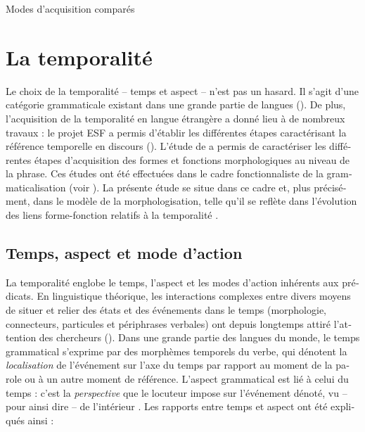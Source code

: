 \documentclass[french, output=paper]{langscibook}
\begin{document}
\begin{otherlanguage}{french}
\begin{table}
\caption{\label{fig:kihlstedt:1} Modes d’acquisition comparés}
\end{table}

\section{La temporalité}\label{sec:kihlstedt:1}\largerpage

Le choix de la temporalité – temps et aspect – n’est pas un hasard. Il s’agit d’une catégorie grammaticale existant dans une grande partie de langues (\citealt{BickelNichols2013}). De plus, l’acquisition de la temporalité en langue étrangère a donné lieu à de nombreux travaux : le projet ESF a permis d’établir les différentes étapes caractérisant la référence temporelle en discours (\citealt{DietrichEtAl1995}). L’étude de \citet{BartningSchlyter2004} a permis de caractériser les différentes étapes d’acquisition des formes et fonctions morphologiques au niveau de la phrase. Ces études ont été effectuées dans le cadre fonctionnaliste de la grammaticalisation (voir \citealt{Véronique1992, Véronique2009}). La présente étude se situe dans ce cadre et, plus précisément, dans le modèle de la morphologisation, telle qu’il se reflète dans l’évolution des liens forme-fonction relatifs à la temporalité \citep{Noyau1998}. 


\subsection{Temps, aspect et mode d’action}\label{sec:kihlstedt:1.1}

La temporalité englobe le temps, l’aspect et les modes d’action inhérents aux prédicats. En linguistique théorique, les interactions complexes entre divers moyens de situer et relier des états et des événements dans le temps (morphologie, connecteurs, particules et périphrases verbales) ont depuis longtemps attiré l’attention des chercheurs (\citealt{Reichenbach1947, Comrie1976, Dahl1985, BybeeDahl1989, Smith1991, Klein1994, KleinLi2009}). Dans une grande partie des langues du monde, le temps grammatical s’exprime par des morphèmes temporels du verbe, qui dénotent la \textit{localisation} de l’événement sur l’axe du temps par rapport au moment de la parole ou à un autre moment de référence. L’aspect grammatical est lié à celui du temps : c’est la \textit{perspective} que le locuteur impose sur l’événement dénoté, vu -- pour ainsi dire -- de l’intérieur \citep{Smith1991}. Les rapports entre temps et aspect ont été expliqués ainsi : 



\end{otherlanguage}
\end{document}
